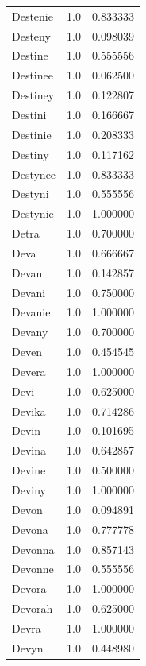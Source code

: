 \documentclass[
  letterpaper,
  DIV=11,
  numbers=noendperiod]{scrreprt}
\begin{document}
\begin{tabular}{lrr}
Destenie        &   1.0 &   0.833333 \\
Desteny         &   1.0 &   0.098039 \\
Destine         &   1.0 &   0.555556 \\
Destinee        &   1.0 &   0.062500 \\
Destiney        &   1.0 &   0.122807 \\
Destini         &   1.0 &   0.166667 \\
Destinie        &   1.0 &   0.208333 \\
Destiny         &   1.0 &   0.117162 \\
Destynee        &   1.0 &   0.833333 \\
Destyni         &   1.0 &   0.555556 \\
Destynie        &   1.0 &   1.000000 \\
Detra           &   1.0 &   0.700000 \\
Deva            &   1.0 &   0.666667 \\
Devan           &   1.0 &   0.142857 \\
Devani          &   1.0 &   0.750000 \\
Devanie         &   1.0 &   1.000000 \\
Devany          &   1.0 &   0.700000 \\
Deven           &   1.0 &   0.454545 \\
Devera          &   1.0 &   1.000000 \\
Devi            &   1.0 &   0.625000 \\
Devika          &   1.0 &   0.714286 \\
Devin           &   1.0 &   0.101695 \\
Devina          &   1.0 &   0.642857 \\
Devine          &   1.0 &   0.500000 \\
Deviny          &   1.0 &   1.000000 \\
Devon           &   1.0 &   0.094891 \\
Devona          &   1.0 &   0.777778 \\
Devonna         &   1.0 &   0.857143 \\
Devonne         &   1.0 &   0.555556 \\
Devora          &   1.0 &   1.000000 \\
Devorah         &   1.0 &   0.625000 \\
Devra           &   1.0 &   1.000000 \\
Devyn           &   1.0 &   0.448980 \\

\end{tabular}
\end{document}
